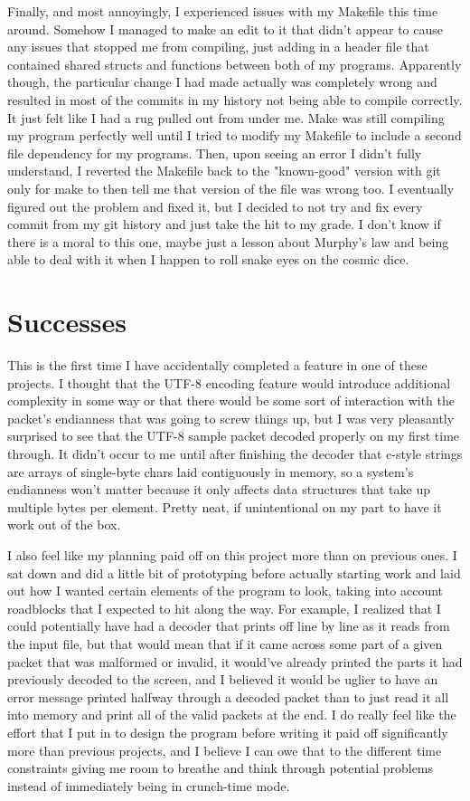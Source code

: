 \documentclass[11pt]{report}
\begin{document}
Finally, and most annoyingly, I experienced issues with my Makefile this time around. Somehow I managed to make an edit to it that didn't appear to cause any issues that stopped me from compiling, just adding in a header file that contained shared structs and functions between both of my programs. Apparently though, the particular change I had made actually was completely wrong and resulted in most of the commits in my history not being able to compile correctly. It just felt like I had a rug pulled out from under me. Make was still compiling my program perfectly well until I tried to modify my Makefile to include a second file dependency for my programs. Then, upon seeing an error I didn't fully understand, I reverted the Makefile back to the "known-good" version with git only for make to then tell me that version of the file was wrong too. I eventually figured out the problem and fixed it, but I decided to not try and fix every commit from my git history and just take the hit to my grade. I don't know if there is a moral to this one, maybe just a lesson about Murphy's law and being able to deal with it when I happen to roll snake eyes on the cosmic dice.
\section*{Successes}
This is the first time I have accidentally completed a feature in one of these projects. I thought that the UTF-8 encoding feature would introduce additional complexity in some way or that there would be some sort of interaction with the packet's endianness that was going to screw things up, but I was very pleasantly surprised to see that the UTF-8 sample packet decoded properly on my first time through. It didn't occur to me until after finishing the decoder that c-style strings are arrays of single-byte chars laid contiguously in memory, so a system's endianness won't matter because it only affects data structures that take up multiple bytes per element. Pretty neat, if unintentional on my part to have it work out of the box.

I also feel like my planning paid off on this project more than on previous ones. I sat down and did a little bit of prototyping before actually starting work and laid out how I wanted certain elements of the program to look, taking into account roadblocks that I expected to hit along the way. For example, I realized that I could potentially have had a decoder that prints off line by line as it reads from the input file, but that would mean that if it came across some part of a given packet that was malformed or invalid, it would've already printed the parts it had previously decoded to the screen, and I believed it would be uglier to have an error message printed halfway through a decoded packet than to just read it all into memory and print all of the valid packets at the end. I do really feel like the effort that I put in to design the program before writing it paid off significantly more than previous projects, and I believe I can owe that to the different time constraints giving me room to breathe and think through potential problems instead of immediately being in crunch-time mode.
\end{document}

